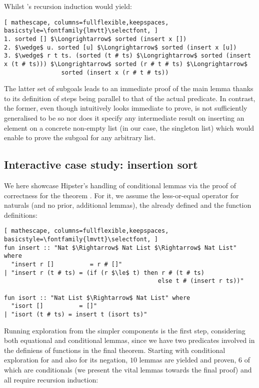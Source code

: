 \noindent Whilst 's recursion induction would yield:

\begin{lstlisting}[ mathescape, columns=fullflexible,keepspaces, basicstyle=\fontfamily{lmvtt}\selectfont, ]
1. sorted [] $\Longrightarrow$ sorted (insert x [])
2. $\wedge$ u. sorted [u] $\Longrightarrow$ sorted (insert x [u])
3. $\wedge$ r t ts. (sorted (t # ts) $\Longrightarrow$ sorted (insert x (t # ts))) $\Longrightarrow$ sorted (r # t # ts) $\Longrightarrow$
                sorted (insert x (r # t # ts))
\end{lstlisting}

The latter set of subgoals leads to an immediate proof of the main lemma thanks to its definition of steps being parallel to that of the actual predicate.
%
In contrast, the former, even though intuitively looks immediate to prove, is not sufficiently generalised to be so nor does it specify any intermediate result on inserting an element on a concrete non-empty list (in our case, the singleton list) which would enable to prove the subgoal for any arbitrary list.


\subsection{Interactive case study: insertion sort}

We here showcase Hipster's handling of conditional lemmas via the proof of correctness for the theorem .
%
For it, we assume the less-or-equal operator \isaCode{$\le$} for naturals (and no prior, additional lemmas), the already defined  and the function definitions:

\begin{lstlisting}[ mathescape, columns=fullflexible,keepspaces, basicstyle=\fontfamily{lmvtt}\selectfont, ]
fun insert :: "Nat $\Rightarrow$ Nat List $\Rightarrow$ Nat List" where
  "insert r []          = r # []"
| "insert r (t # ts) = (if (r $\le$ t) then r # (t # ts)	
                                           else t # (insert r ts))"

fun isort :: "Nat List $\Rightarrow$ Nat List" where
  "isort []          = []"
| "isort (t # ts) = insert t (isort ts)"
\end{lstlisting}

Running exploration from the simpler components is the first step, considering both equational and conditional lemmas, since we have two predicates involved in the definiens of functions in the final theorem.
%
Starting with conditional exploration for \isaCode{$\le$} and also for its negation, $10$ lemmas are yielded and proven, $6$ of which are conditionals (we present the vital lemmas towards the final proof) and all require recursion induction:


